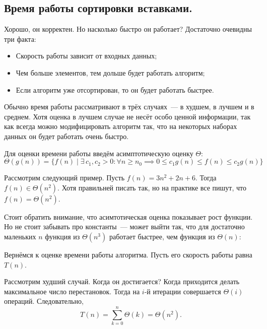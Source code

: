 \documentclass[a4paper,12pt]{article}
\begin{document}
\subsection{Время работы сортировки вставками.}
Хорошо, он корректен. Но насколько быстро он работает? Достаточно очевидны три факта:
\begin{itemize}
	\item Скорость работы зависит от входных данных;
	\item Чем больше элементов, тем дольше будет работать алгоритм;
	\item Если алгоритм уже отсортирован, то он будет работать быстрее.
	\end{itemize}
	Обычно время работы рассматривают в трёх случаях~--- в худшем, в лучшем и в среднем. Хотя оценка в лучшем случае не несёт особо ценной информации, так как всегда можно модифицировать алгоритм так, что на некоторых наборах данных он будет работать очень быстро.
	
	Для оценки времени работы введём асимптотическую оценку \(\Theta\):
	\[\Theta(g(n)) = \{f(n)\mid\exists\,c_1, c_2 > 0: \forall n\geqslant n_0 \implies 0 \leqslant c_1g(n) \leqslant f(n) \leqslant c_2g(n)\}\]
	
	Рассмотрим следующий пример. Пусть \(f(n) = 3n^2 + 2n + 6\). Тогда \(f(n) \in \Theta(n^2)\). Хотя правильней писать так, но на практике все пишут, что \(f(n) = \Theta(n^2)\).
	
	Стоит обратить внимание, что асимтотическая оценка показывает рост функции. Но не стоит забывать про константы~--- может выйти так, что для достаточно маленьких \(n\) функция из \(\Theta(n^3)\) работает быстрее, чем функция из \(\Theta(n)\):
	\begin{center}
		\end{center}
		
		Вернёмся к оценке времени работы алгоритма. Пусть его скорость работы равна \(T(n)\).
		
		Рассмотрим худший случай. Когда он достигается? Когда приходится делать максимальное число перестановок. Тогда на \(i\)-й итерации совершается \(\Theta(i)\) операций. Следовательно, \[T(n) = \sum_{k = 0}^{n} \Theta(k) = \Theta(n^2).\]
		
\end{document}

